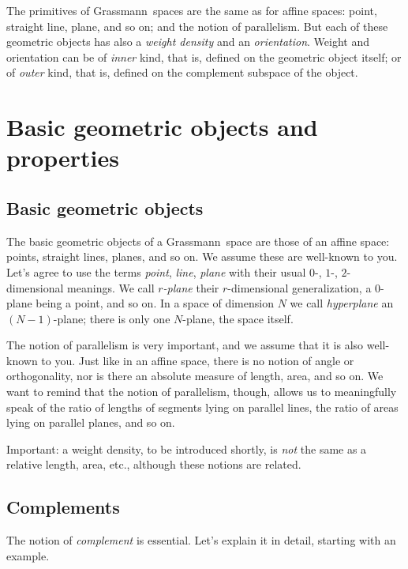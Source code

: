 \documentclass[\ifafour a4paper,12pt,\else a5paper,10pt,\fi%
onecolumn,oneside,article,%
british%
]{memoir}
\theoremstyle{remark}
\theoremstyle{innote}
\renewcommand*{\|}{\nonscript\,\vert\nonscript\;\mathopen{}}
\newcommand*{\etc}{{etc.}}
\newcommand*{\gm}{Grassmann}
\newcommand*{\yr}{r}
\newcommand*{\yN}{N}
\begin{document}
The primitives of \gm\ spaces are the same as for affine spaces: point,
straight line, plane, and so on; and the notion of parallelism. But each of
these geometric objects has also a \emph{weight density} and an
\emph{orientation}. Weight and orientation can be of \emph{inner} kind,
that is, defined on the geometric object itself; or of \emph{outer} kind,
that is, defined on the complement subspace of the object.


\section{Basic geometric objects and properties}
\label{sec:basic_objects_properties}


\subsection{Basic geometric objects}
\label{sec:points_etc}

The basic geometric objects of a \gm\ space are those of an affine space:
points, straight lines, planes, and so on. We assume these are well-known
to you. Let's agree to use the terms \emph{point}, \emph{line},
\emph{plane} with their usual $0$-, $1$-, $2$-dimensional meanings. We call
\emph{$\yr$-plane} their $\yr$-dimensional generalization, a $0$-plane
being a point, and so on. In a space of dimension $\yN$ we call
\emph{hyperplane} an $(\yN-1)$-plane; there is only one $\yN$-plane, the
space itself.

The notion of parallelism is very important, and we assume that it is also
well-known to you. Just like in an affine space, there is no notion of
angle or orthogonality, nor is there an absolute measure of length, area,
and so on. We want to remind that the notion of parallelism, though, allows
us to meaningfully speak of the ratio of lengths of segments lying on
parallel lines, the ratio of areas lying on parallel planes, and so on.

Important: a weight density, to be introduced shortly, is \emph{not} the
same as a relative length, area, \etc, although these notions are related.

\subsection{Complements}
\label{sec:complements}

The notion of \emph{complement} is essential. Let's explain it in detail,
starting with an example.
\end{document}

